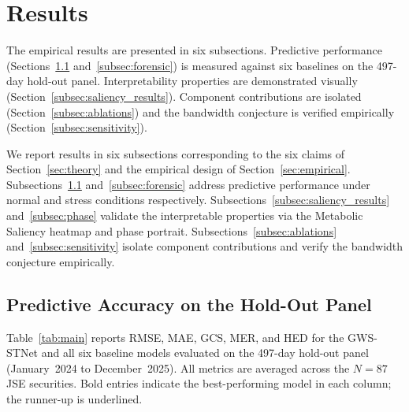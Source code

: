 \documentclass[11pt,a4paper]{article}  %
\theoremstyle{plain}
\theoremstyle{definition}
\theoremstyle{remark}
\begin{document}
\section{Results}
\label{sec:results}

The empirical results are presented in six subsections.
Predictive performance (Sections~\ref{subsec:accuracy}
and~\ref{subsec:forensic}) is measured against six baselines
on the 497-day hold-out panel. Interpretability properties are
demonstrated visually (Section~\ref{subsec:saliency_results}).
Component contributions are isolated (Section~\ref{subsec:ablations})
and the bandwidth conjecture is verified empirically
(Section~\ref{subsec:sensitivity}).

We report results in six subsections corresponding to the
six claims of Section~\ref{sec:theory} and the empirical
design of Section~\ref{sec:empirical}. Subsections~\ref{subsec:accuracy}
and~\ref{subsec:forensic} address predictive performance under
normal and stress conditions respectively. Subsections~\ref{subsec:saliency_results}
and~\ref{subsec:phase} validate the interpretable properties via
the Metabolic Saliency heatmap and phase portrait.
Subsections~\ref{subsec:ablations} and~\ref{subsec:sensitivity}
isolate component contributions and verify the bandwidth
conjecture empirically.


\subsection{Predictive Accuracy on the Hold-Out Panel}
\label{subsec:accuracy}

Table~\ref{tab:main} reports RMSE, MAE, GCS, MER, and HED for the
GWS-STNet and all six baseline models evaluated on the 497-day
hold-out panel (January~2024 to December~2025). All metrics are
averaged across the $N = 87$ JSE securities. Bold entries indicate
the best-performing model in each column; the runner-up is underlined.
\end{document}
